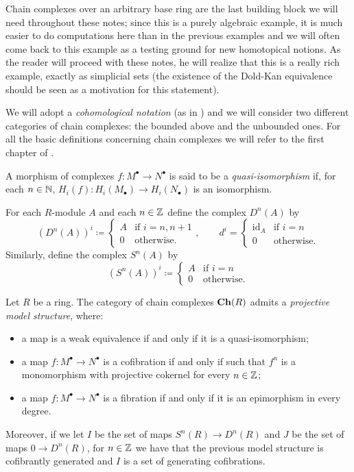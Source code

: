 \begin{refsection}
Chain complexes over an arbitrary base ring are the last building block we will need throughout these notes; since this is a purely algebraic example, it is much easier to do computations here than in the previous examples and we will often come back to this example as a testing ground for new homotopical notions. As the reader will proceed with these notes, he will realize that this is a really rich example, exactly as simplicial sets (the existence of the Dold-Kan equivalence should be seen as a motivation for this statement).

We will adopt a \emph{cohomological notation} (as in \cite{hagII}) and we will consider two different categories of chain complexes: the bounded above and the unbounded ones. For all the basic definitions concerning chain complexes we will refer to the first chapter of \cite{weibel}.

\begin{defin}
A morphism of complexes $f \colon M^\bullet \to N^\bullet$ is said to be a \emph{quasi-isomorphism} if, for each $n \in \mathbb{N}$, $H_i(f) \colon H_i(M_\bullet) \to H_i(N_\bullet)$ is an isomorphism.
\end{defin}

For each $R$-module $A$ and each $n \in \mathbb{Z}$ define the complex $D^n(A)$ by
\[
(D^n(A))^i \coloneqq \begin{cases} A & \text{if } i = n,n+1 \\ 0 & \text{otherwise.} \end{cases}, \qquad d^i = \begin{cases}  \mathrm{id}_A & \text{if } i = n \\ 0 & \text{otherwise.} \end{cases}
\]
Similarly, define the complex $S^n(A)$ by
\[
(S^n(A))^i \coloneqq \begin{cases} A & \text{if } i = n \\ 0 & \text{otherwise.} \end{cases}
\]

\begin{thm} \label{thm model structure unbounded complexes}
Let $R$ be a ring. The category of chain complexes $\mathbf{Ch}(R)$ admits a \emph{projective model structure}, where:
\begin{itemize}
\item a map is a weak equivalence if and only if it is a quasi-isomorphism;
\item a map $f \colon M^\bullet \to N^\bullet$ is a cofibration if and only if such that $f^n$ is a monomorphism with projective cokernel for every $n \in \mathbb{Z}$;
\item a map $f \colon M^\bullet \to N^\bullet$ is a fibration if and only if it is an epimorphism in every degree.
\end{itemize}
Moreover, if we let $I$ be the set of maps $S^n(R) \to D^n(R)$ and $J$ be the set of maps $0 \to D^n(R)$, for $n \in \mathbb{Z}$ we have that the previous model structure is cofibrantly generated and $I$ is a set of generating cofibrations.
\end{thm}


\end{refsection}
